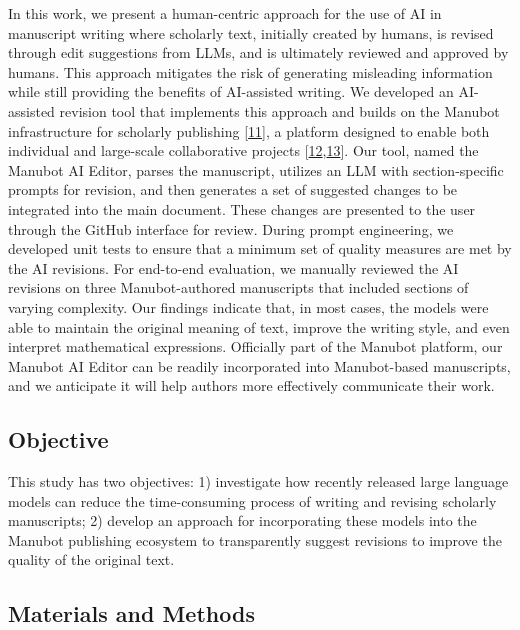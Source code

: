 \documentclass[
]{article}
\begin{document}
In this work, we present a human-centric approach for the use of AI in manuscript writing where scholarly text, initially created by humans, is revised through edit suggestions from LLMs, and is ultimately reviewed and approved by humans.
This approach mitigates the risk of generating misleading information while still providing the benefits of AI-assisted writing.
We developed an AI-assisted revision tool that implements this approach and builds on the Manubot infrastructure for scholarly publishing {[}\protect\hyperlink{ref-YuJbg3zO}{11}{]}, a platform designed to enable both individual and large-scale collaborative projects {[}\protect\hyperlink{ref-PZMP42Ak}{12},\protect\hyperlink{ref-10gsAq0o}{13}{]}.
Our tool, named the Manubot AI Editor, parses the manuscript, utilizes an LLM with section-specific prompts for revision, and then generates a set of suggested changes to be integrated into the main document.
These changes are presented to the user through the GitHub interface for review.
During prompt engineering, we developed unit tests to ensure that a minimum set of quality measures are met by the AI revisions.
For end-to-end evaluation, we manually reviewed the AI revisions on three Manubot-authored manuscripts that included sections of varying complexity.
Our findings indicate that, in most cases, the models were able to maintain the original meaning of text, improve the writing style, and even interpret mathematical expressions.
Officially part of the Manubot platform, our Manubot AI Editor can be readily incorporated into Manubot-based manuscripts, and we anticipate it will help authors more effectively communicate their work.

\hypertarget{objective}{%
\subsection{Objective}\label{objective}}

This study has two objectives:
1) investigate how recently released large language models can reduce the time-consuming process of writing and revising scholarly manuscripts;
2) develop an approach for incorporating these models into the Manubot publishing ecosystem to transparently suggest revisions to improve the quality of the original text.

\hypertarget{materials-and-methods}{%
\subsection{Materials and Methods}\label{materials-and-methods}}
\end{document}
